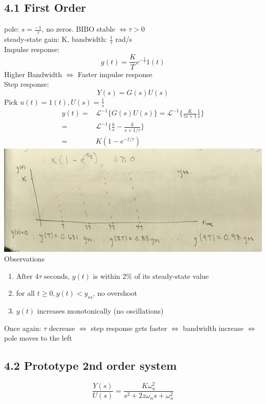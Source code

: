 \documentclass[letterpaper]{article}
\begin{document}
\subsection*{4.1 First Order}
pole: $s=\frac{-1}{\tau}$, no zeros. BIBO stable $\iff \tau >0$\\
steady-state gain: K, bandwidth: $\frac{1}{\tau}$ rad/s\\
Impulse response: $$g(t)=\frac{K}{T}e^{-\frac{t}{\tau}}1(t)$$
Higher Bandwidth $\iff$ Faster impulse response\\
	
	
Step response:\\
$$Y(s)=G(s)U(s)$$
Pick $u(t)=1(t),U(s)=\frac{1}{s}$
\begin{align*}
	y(t)= & \mathscr{L}^{-1}\{G(s)U(s)\}=\mathscr{L}^{-1}\{\frac{K}{\tau s +1}\frac{1}{s}\} \\
	=     & \mathscr{L}^{-1}\{\frac{k}{s}-\frac{k}{s+1/\tau}\}                              \\
	=     & K(1-e^{-t/\tau})                                                                
\end{align*}
\includegraphics[scale=0.1]{images/4_2_STOP_RESPONSE.jpg}\\
Observations
\begin{enumerate}
	\item After 4$\tau$ seconds, $y(t)$ is within 2\% of its steady-state value
	\item for all $t\geq 0,y(t)<y_{ss}$, no overshoot
	\item $y(t)$ increases monotonically (no oscillations)
\end{enumerate}
Once again: $\tau$ decrease $\iff$ step response gets faster $\iff$ bandwidth increase $\iff$ pole moves to the left
\subsection*{4.2 Prototype 2nd order system}
$$\frac{Y(s)}{U(s)}=\frac{K\omega_n^2}{s^2+2z\omega_n s+\omega_n^2}$$
\end{document}
